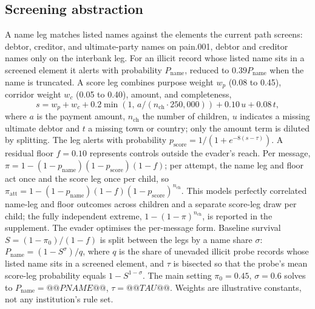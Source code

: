 \documentclass[conference]{IEEEtran}
\begin{document}
\subsection{Screening abstraction}
A name leg matches listed names against the elements the current path
screens: debtor, creditor, and ultimate-party names on pain.001, debtor and
creditor names only on the interbank leg. For an illicit record whose listed
name sits in a screened element it alerts with probability $P_{\mathrm{name}}$,
reduced to $0.39P_{\mathrm{name}}$ when the name is truncated. A score leg
combines purpose weight $w_p$ (0.08 to 0.45), corridor weight $w_c$ (0.05 to
0.40), amount, and completeness,
\begin{equation}
 s=w_p+w_c+0.2\min(1,\,a/(n_{\mathrm{ch}}\cdot 250{,}000))+0.10\,u+0.08\,t,
 \label{eq:score}
\end{equation}
where $a$ is the payment amount, $n_{\mathrm{ch}}$ the number of children, $u$
indicates a missing ultimate debtor and $t$ a missing town or country; only
the amount term is diluted by splitting. The leg alerts with probability
$p_{\mathrm{score}}=1/(1+e^{-8(s-\tau)})$. A residual floor $f=0.10$ represents
controls outside the evader's reach. Per message,
$\pi=1-(1-p_{\mathrm{name}})(1-p_{\mathrm{score}})(1-f)$; per attempt, the
name leg and floor act once and the score leg once per child, so
$\pi_{\mathrm{att}}=1-(1-p_{\mathrm{name}})(1-f)(1-p_{\mathrm{score}})^{n_{\mathrm{ch}}}$.
This models perfectly correlated name-leg and floor outcomes across
children and a separate score-leg draw per child; the fully independent
extreme, $1-(1-\pi)^{n_{\mathrm{ch}}}$, is reported in the supplement. The
evader optimises the per-message form. Baseline survival $S=(1-\pi_0)/(1-f)$ is split between the legs by a name
share $\sigma$: $P_{\mathrm{name}}=(1-S^{\sigma})/q$, where $q$ is the share
of unevaded illicit probe records whose listed name sits in a screened
element, and $\tau$ is bisected so that the probe's mean score-leg
probability equals $1-S^{1-\sigma}$. The main setting $\pi_0=0.45$,
$\sigma=0.6$ solves to $P_{\mathrm{name}}=@@PNAME@@$, $\tau=@@TAU@@$. Weights
are illustrative constants, not any institution's rule set.
\end{document}
